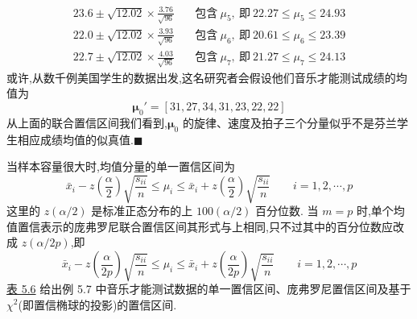 \begin{align*}
23.6\pm\sqrt{12.02}\times\frac{3.76}{\sqrt{96}}&\quad\text{包含}\ \mu_5,\ \text{即}\ 22.27\leqslant\mu_5\leqslant24.93\\
22.0\pm\sqrt{12.02}\times\frac{3.93}{\sqrt{96}}&\quad\text{包含}\ \mu_6,\ \text{即}\ 20.61\leqslant\mu_6\leqslant23.39\\
22.7\pm\sqrt{12.02}\times\frac{4.03}{\sqrt{96}}&\quad\text{包含}\ \mu_7,\ \text{即}\ 21.27\leqslant\mu_7\leqslant24.13
\end{align*}
或许,从数千例美国学生的数据出发,这名研究者会假设他们音乐才能测试成绩的均值为
\[
\boldsymbol{\mu}_0'=[31,27,34,31,23,22,22]
\]
从上面的联合置信区间我们看到,$\boldsymbol{\mu}_0$ 的旋律、速度及拍子三个分量似乎不是芬兰学生相应成绩均值的似真值.\hfill$\blacksquare$

当样本容量很大时,均值分量的单一置信区间为
\[
\bar{x}_i-z\left(\frac{\alpha}{2}\right)\sqrt{\frac{s_{ii}}{n}}\leqslant\mu_i\leqslant\bar{x}_i+z\left(\frac{\alpha}{2}\right)\sqrt{\frac{s_{ii}}{n}}\qquad i=1,2,\cdots,p
\]
这里的 $z(\alpha/2)$ 是标准正态分布的上 $100(\alpha/2)$ 百分位数. 当 $m=p$ 时,单个均值置信表示的庞弗罗尼联合置信区间其形式与上相同,只不过其中的百分位数应改成 $z(\alpha/2p)$,即
\[
\bar{x}_i-z\left(\frac{\alpha}{2p}\right)\sqrt{\frac{s_{ii}}{n}}\leqslant\mu_i\leqslant\bar{x}_i+z\left(\frac{\alpha}{2p}\right)\sqrt{\frac{s_{ii}}{n}}\qquad i=1,2,\cdots,p
\]
\hyperref[tab:5.6]{表 5.6} 给出例 5.7 中音乐才能测试数据的单一置信区间、庞弗罗尼置信区间及基于 $\chi^{2}$(即置信椭球的投影)的置信区间.

